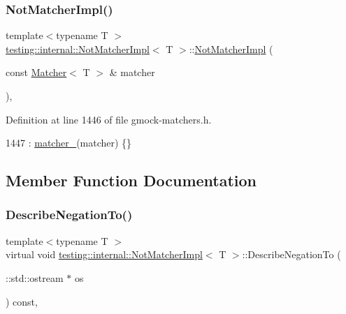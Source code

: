 \subsubsection{\texorpdfstring{Not\+Matcher\+Impl()}{NotMatcherImpl()}}
{\footnotesize\ttfamily template$<$typename T $>$ \\
\hyperlink{classtesting_1_1internal_1_1NotMatcherImpl}{testing\+::internal\+::\+Not\+Matcher\+Impl}$<$ T $>$\+::\hyperlink{classtesting_1_1internal_1_1NotMatcherImpl}{Not\+Matcher\+Impl} (\begin{DoxyParamCaption}\item[{const \hyperlink{classtesting_1_1Matcher}{Matcher}$<$ T $>$ \&}]{matcher }\end{DoxyParamCaption})\hspace{0.3cm}{\ttfamily [inline]}, {\ttfamily [explicit]}}



Definition at line 1446 of file gmock-\/matchers.\+h.


\begin{DoxyCode}
1447       : \hyperlink{classtesting_1_1internal_1_1NotMatcherImpl_a913c0244b28d9b9227a8a7353aedb648}{matcher\_}(matcher) \{\}
\end{DoxyCode}


\subsection{Member Function Documentation}
\mbox{\label{classtesting_1_1internal_1_1NotMatcherImpl_a960f799e25ba7264d0d45fa61bb9271c}} 
\subsubsection{\texorpdfstring{Describe\+Negation\+To()}{DescribeNegationTo()}}
{\footnotesize\ttfamily template$<$typename T $>$ \\
virtual void \hyperlink{classtesting_1_1internal_1_1NotMatcherImpl}{testing\+::internal\+::\+Not\+Matcher\+Impl}$<$ T $>$\+::Describe\+Negation\+To (\begin{DoxyParamCaption}\item[{\+::std\+::ostream $\ast$}]{os }\end{DoxyParamCaption}) const\hspace{0.3cm}{\ttfamily [inline]}, {\ttfamily [virtual]}}



